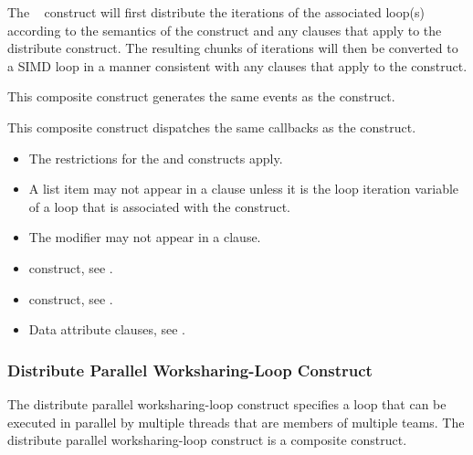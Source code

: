 \descr
The ~ construct will first distribute the iterations 
of the associated loop(s) according to the semantics of the  
construct and any clauses that apply to the distribute construct. The resulting 
chunks of iterations will then be converted to a SIMD loop in a manner consistent 
with any clauses that apply to the  construct.

\events

This composite construct generates the same events as the  construct.

\tools

This composite construct dispatches the same callbacks as the  
construct.

\restrictions
\begin{itemize}
\item The restrictions for the  and  constructs apply.
\item A list item may not appear in a  clause unless it is the
      loop iteration variable of a loop that is associated with the construct.
\item The  modifier may not appear in a  clause.
\end{itemize}

\crossreferences
\begin{itemize}
\item {} construct, see
.

\item {} construct, see
.

\item Data attribute clauses, see
.
\end{itemize}



\subsubsection{Distribute Parallel Worksharing-Loop Construct}
\label{subsec:Distribute Parallel Worksharing-Loop Construct}
\summary
The distribute parallel worksharing-loop construct specifies a loop that can 
be executed in parallel by multiple threads that are members of multiple teams. 
The distribute parallel worksharing-loop construct is a composite construct.

